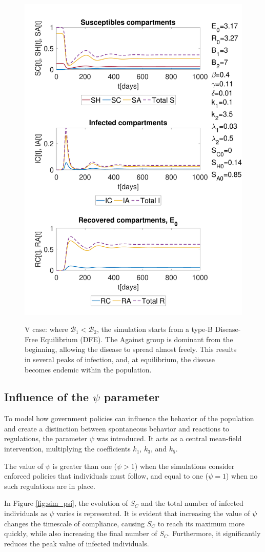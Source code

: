 \begin{figure}[h]
	\centering
	{\includegraphics[width=0.5\linewidth]{1_corpo/figure/behav_epi_sim/E_0_model_3epi_behav_sim_B2_mag_B1}} 
	\caption[Full model simulation figure third]{V case: where \( \mathcal{B}_1 < \mathcal{B}_2 \), the simulation starts from a type-B Disease-Free Equilibrium (DFE). The Against group is dominant from the beginning, allowing the disease to spread almost freely. This results in several peaks of infection, and, at equilibrium, the disease becomes endemic within the population.}
	\label{fig:sim_B1_less_B2}
\end{figure}









\subsection{Influence of the $\psi$ parameter}
To model how government policies can influence the behavior of the population and create a distinction between spontaneous behavior and reactions to regulations, the parameter $\psi$ was introduced. It acts as a central mean-field intervention, multiplying the coefficients $k_1$, $k_3$, and $k_5$.

The value of $\psi$ is greater than one ($\psi > 1$) when the simulations consider enforced policies that individuals must follow, and equal to one ($\psi = 1$) when no such regulations are in place.

In Figure \ref{fig:sim_psi}, the evolution of $S_C$ and the total number of infected individuals as $\psi$ varies is represented. It is evident that increasing the value of $\psi$ changes the timescale of compliance, causing $S_C$ to reach its maximum more quickly, while also increasing the final number of $S_C$. Furthermore, it significantly reduces the peak value of infected individuals.

